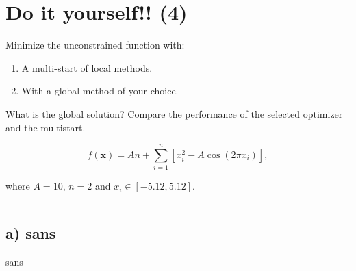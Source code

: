 \documentclass[11pt]{article}
\title{}
\author{\textbf{Alejandro Victorero Domínguez}}
\date{Universidad de Santiago de Compostela\\[2ex]\today}
\begin{document}
\maketitle

\section*{Do it yourself!! (4)} 
Minimize the unconstrained function with:
\begin{enumerate}[label=\alph*)]
	\item A multi-start of local methods.
	\item With a global method of your choice.
\end{enumerate}

What is the global solution? Compare the performance of the selected optimizer and the multistart.

\begin{equation*}
f(\mathbf{x})=An+\sum_{i=1}^n\left[ x_i^2 -A\cos (2\pi x_i)\right],
\end{equation*}

where $A=10$, $n=2$ and $x_i\in [-5.12 , 5.12]$.
\vspace{0.25cm}
\hrule\vspace{0.25cm}
\subsection*{a) sans}

sans
\end{document}
